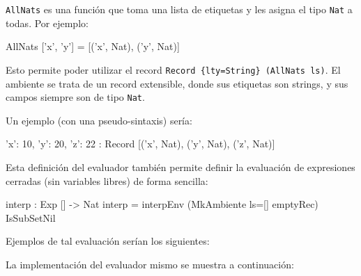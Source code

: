 \texttt{AllNats} es una función que toma una lista de etiquetas y les asigna el tipo \texttt{Nat} a todas. Por ejemplo:

\begin{code}
AllNats ['x', 'y'] = [('x', Nat), ('y', Nat)]
\end{code}

Esto permite poder utilizar el record \texttt{Record \{lty=String\} (AllNats ls)}. El ambiente se trata de un record extensible, donde sus etiquetas son strings, y sus campos siempre son de tipo \texttt{Nat}.

Un ejemplo (con una pseudo-sintaxis) sería:

\begin{code}
{ 'x': 10, 'y': 20, 'z': 22 } : 
  Record [('x', Nat), ('y', Nat), ('z', Nat)]
\end{code}

Esta definición del evaluador también permite definir la evaluación de expresiones cerradas (sin variables libres) de forma sencilla:

\begin {code}
interp : Exp [] -> Nat
interp = interpEnv (MkAmbiente {ls=[]} emptyRec) IsSubSetNil
\end{code}

Ejemplos de tal evaluación serían los siguientes:


La implementación del evaluador mismo se muestra a continuación:

